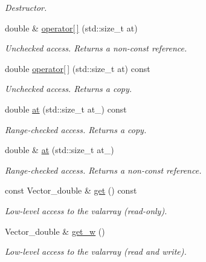\begin{DoxyCompactItemize}
\begin{DoxyCompactList}\small\item\em Destructor. \item\end{DoxyCompactList}\item 
double \& \hyperlink{classSection_a6f6e72115cb253df1316c2005156fd29}{operator\mbox{[}$\,$\mbox{]}} (std::size\_\-t at)
\begin{DoxyCompactList}\small\item\em Unchecked access. Returns a non-\/const reference. \item\end{DoxyCompactList}\item 
double \hyperlink{classSection_a721b8cf4b65cd5a80f4ad3bb28a24b65}{operator\mbox{[}$\,$\mbox{]}} (std::size\_\-t at) const 
\begin{DoxyCompactList}\small\item\em Unchecked access. Returns a copy. \item\end{DoxyCompactList}\item 
double \hyperlink{classSection_ab98c2b404571d18fe6d48ae2284fe858}{at} (std::size\_\-t at\_\-) const 
\begin{DoxyCompactList}\small\item\em Range-\/checked access. Returns a copy. \item\end{DoxyCompactList}\item 
double \& \hyperlink{classSection_a5b506d0c6ec0fe3ad938198748f6f9c9}{at} (std::size\_\-t at\_\-)
\begin{DoxyCompactList}\small\item\em Range-\/checked access. Returns a non-\/const reference. \item\end{DoxyCompactList}\item 
const Vector\_\-double \& \hyperlink{classSection_ac807068714bffde739c88ab9fde0606a}{get} () const 
\begin{DoxyCompactList}\small\item\em Low-\/level access to the valarray (read-\/only). \item\end{DoxyCompactList}\item 
Vector\_\-double \& \hyperlink{classSection_acdd69b0abf2d2ffd9c85cf3736437c28}{get\_\-w} ()
\begin{DoxyCompactList}\small\item\em Low-\/level access to the valarray (read and write). \item\end{DoxyCompactList}\item 

\end{DoxyCompactItemize}
